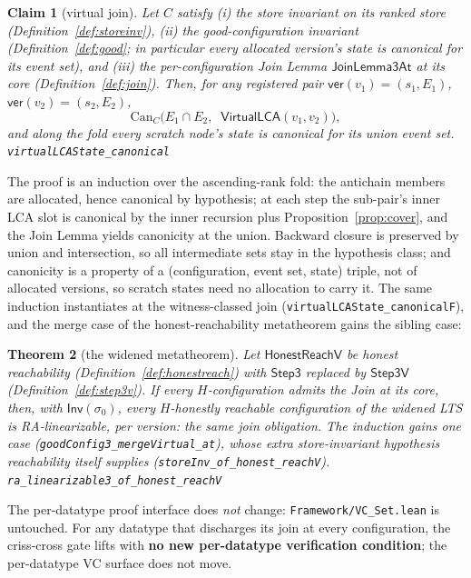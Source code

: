 \documentclass[11pt]{article}
\newtheorem{theorem}{Theorem}[section]
\newtheorem{claim}[theorem]{Claim}
\newcommand{\Sinit}{\sigma_0}
\newcommand{\lean}[1]{\texttt{#1}}
\newcommand{\Inv}{\mathsf{Inv}}
\begin{document}
\begin{claim}[virtual join]
\label{claim:vjoin}
Let $C$ satisfy (i) the store invariant on its ranked store
(Definition~\ref{def:storeinv}), (ii) the good-configuration invariant
(Definition~\ref{def:good}; in particular every allocated version's
state is canonical for its event set), and (iii) the per-configuration
Join Lemma $\mathsf{JoinLemma3At}$ at its core
(Definition~\ref{def:join}). Then, for any registered pair
$\mathsf{ver}(v_1) = (s_1, E_1)$, $\mathsf{ver}(v_2) = (s_2, E_2)$,
\[
  \mathrm{Can}_C\bigl(E_1 \cap E_2,\;\; \mathsf{VirtualLCA}(v_1, v_2)\bigr),
\]
and along the fold every scratch node's state is canonical for its union
event set.
\hfill\lean{virtualLCAState\_canonical}
\end{claim}

The proof is an induction over the ascending-rank fold: the antichain
members are allocated, hence canonical by hypothesis; at each step the
sub-pair's inner LCA slot is canonical by the inner recursion plus
Proposition~\ref{prop:cover}, and the Join Lemma yields canonicity at
the union. Backward closure is preserved by union and intersection, so
all intermediate sets stay in the hypothesis class; and canonicity is a
property of a (configuration, event set, state) triple, not of
allocated versions, so scratch states need no allocation to carry it.
The same induction instantiates at the witness-classed join
(\lean{virtualLCAState\_canonicalF}), and the merge case of the
honest-reachability metatheorem gains the sibling case:

\begin{theorem}[the widened metatheorem]
\label{thm:reachV}
Let $\mathsf{HonestReachV}$ be honest reachability
(Definition~\ref{def:honestreach}) with $\mathsf{Step3}$ replaced by
$\mathsf{Step3V}$ (Definition~\ref{def:step3v}). If every
$H$-configuration admits the Join at its core, then, with
$\Inv(\Sinit)$, every $H$-honestly reachable configuration of the
widened LTS is RA-linearizable, per version: the \emph{same} join
obligation. The induction gains one case
(\lean{goodConfig3\_mergeVirtual\_at}), whose extra store-invariant
hypothesis reachability itself supplies
(\lean{storeInv\_of\_honest\_reachV}).
\hfill\lean{ra\_linearizable3\_of\_honest\_reachV}
\end{theorem}

The per-datatype proof interface does
\emph{not} change: \lean{Framework/VC\_Set.lean} is untouched. For any
datatype that discharges its join at every configuration, the criss-cross
gate lifts with \textbf{no new per-datatype verification condition};
the per-datatype VC surface does not move.
\end{document}
